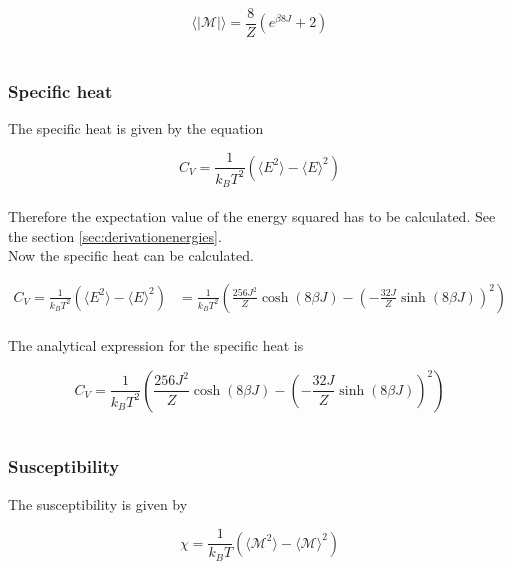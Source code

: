 \documentclass{article}
\begin{document}
\begin{equation} \label{eq:finalmeanmagnetization}
    \langle | \mathcal{M} | \rangle = \frac{8}{Z} \left( e^{\beta 8J} + 2 \right)
\end{equation} \\


\subsubsection{Specific heat} \label{sec:specificheat}

The specific heat is given by the equation

\begin{equation}    \label{eq:specificheat}
    C_V = \frac{1}{k_B T^2} \left( \langle E^2 \rangle - \langle E \rangle ^2 \right)
\end{equation} \\

Therefore the expectation value of the energy squared has to be calculated. See the section \ref{sec:derivationenergies}. \\

Now the specific heat can be calculated.

\begin{align*}
    C_V = \frac{1}{k_B T^2} \left( \langle E^2 \rangle - \langle E \rangle ^2 \right)
    &= \frac{1}{k_B T^2} \left( \frac{256 J^2}{Z} \cosh (8 \beta J) - \left( - \frac{32 J}{Z} \sinh(8 \beta J ) \right) ^2 \right)
\end{align*} \\

The analytical expression for the specific heat is

\begin{equation} \label{eq:finalspecificheat}
    C_V = \frac{1}{k_B T^2} \left( \frac{256 J^2}{Z} \cosh (8 \beta J) - \left( - \frac{32 J}{Z} \sinh(8 \beta J ) \right) ^2 \right)
\end{equation} \\


\subsubsection{Susceptibility} \label{sec:susceptibility}

The susceptibility is given by

\begin{equation}    \label{eq:susceptibility}
    \chi = \frac{1}{k_B T} \left( \langle \mathcal{M}^2 \rangle - \langle \mathcal{M} \rangle ^2 \right)
\end{equation} \\
\end{document}
